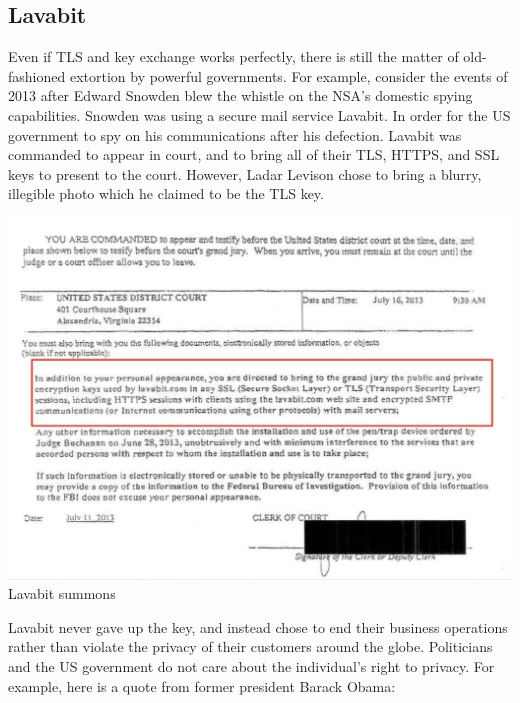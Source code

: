 \documentclass[11pt]{article} %
\begin{document}
\newpage
\subsection{Lavabit}
Even if TLS and key exchange works perfectly, there is still the matter of old-fashioned extortion by powerful governments. For example, consider the events of 2013 after Edward Snowden blew the whistle on the NSA's domestic spying capabilities.
Snowden was using a secure mail service Lavabit. In order for the US government to spy on his communications after his defection. Lavabit was commanded to appear in court, and to bring all of their TLS, HTTPS, and SSL keys to present to the court. However, Ladar Levison chose to bring a blurry, illegible photo which he claimed to be the TLS key.
\begin{center}
\includegraphics[scale=.3]{./lavabit-summons.png}
\\Lavabit summons
\end{center}

Lavabit never gave up the key, and instead chose to end their business operations rather than violate the privacy of their customers around the globe. Politicians and the US government do not care about the individual's right to privacy. For example, here is a quote from former president Barack Obama:
\end{document}
